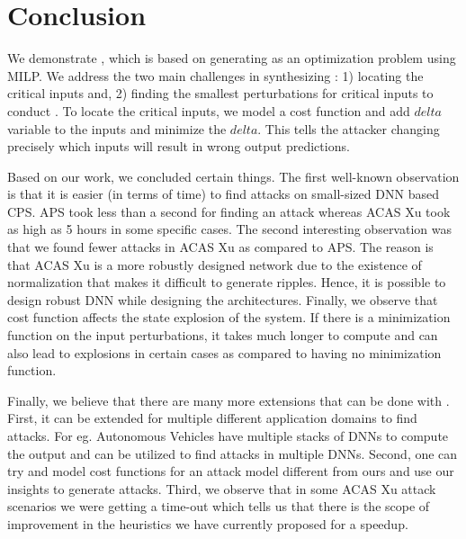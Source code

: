 \chapter{Conclusion}
We demonstrate \tool, which is based on generating \attack as an optimization problem using MILP. We address the two main challenges in synthesizing \attack: 1) locating the critical inputs and, 2) finding the smallest perturbations for critical inputs to conduct \attack. To locate the critical inputs, we model a cost function and add $delta$ variable to the inputs and minimize the $delta$. This tells the attacker changing precisely which inputs will result in wrong output predictions. 


Based on our work, we concluded certain things. The first well-known observation is that it is easier (in terms of time) to find attacks on small-sized DNN based CPS. APS took less than a second for finding an attack whereas ACAS Xu took as high as 5 hours in some specific cases. The second interesting observation was that we found fewer attacks in ACAS Xu as compared to APS. The reason is that ACAS Xu is a more robustly designed network due to the existence of normalization that makes it difficult to generate ripples. Hence, it is possible to design robust DNN while designing the architectures. Finally, we observe that cost function affects the state explosion of the system. If there is a minimization function on the input perturbations, it takes much longer to compute and can also lead to explosions in certain cases as compared to having no minimization function. 



Finally, we believe that there are many more extensions that can be done with \tool. First, it can be extended for multiple different application domains to find attacks. For eg. Autonomous Vehicles have multiple stacks of DNNs to compute the output and \tool can be utilized to find attacks in multiple DNNs. Second, one can try and model cost functions for an attack model different from ours and use our insights to generate attacks. Third, we observe that in some ACAS Xu attack scenarios we were getting a time-out which tells us that there is the scope of improvement in the heuristics we have currently proposed for a speedup.


